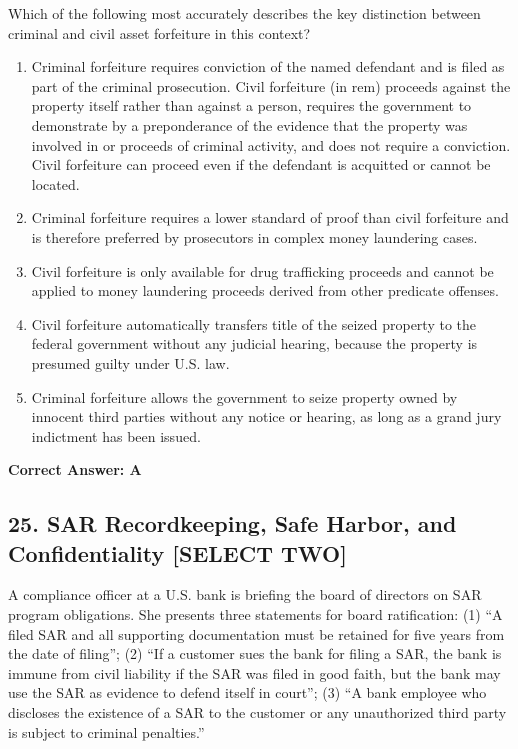 \documentclass[11pt,a4paper]{article}
\begin{document}
	Which of the following most accurately describes the key distinction between criminal and civil asset forfeiture in this context?
	
	\begin{enumerate}[label=\Alph*.]
		\item Criminal forfeiture requires conviction of the named defendant and is filed as part of the criminal prosecution. Civil forfeiture (in rem) proceeds against the property itself rather than against a person, requires the government to demonstrate by a preponderance of the evidence that the property was involved in or proceeds of criminal activity, and does not require a conviction. Civil forfeiture can proceed even if the defendant is acquitted or cannot be located.
		\item Criminal forfeiture requires a lower standard of proof than civil forfeiture and is therefore preferred by prosecutors in complex money laundering cases.
		\item Civil forfeiture is only available for drug trafficking proceeds and cannot be applied to money laundering proceeds derived from other predicate offenses.
		\item Civil forfeiture automatically transfers title of the seized property to the federal government without any judicial hearing, because the property is presumed guilty under U.S. law.
		\item Criminal forfeiture allows the government to seize property owned by innocent third parties without any notice or hearing, as long as a grand jury indictment has been issued.
	\end{enumerate}
	\textbf{Correct Answer: A}
	
	\subsection{25. SAR Recordkeeping, Safe Harbor, and Confidentiality \textnormal{[SELECT TWO]}}
	
	A compliance officer at a U.S. bank is briefing the board of directors on SAR program obligations. She presents three statements for board ratification: (1) ``A filed SAR and all supporting documentation must be retained for five years from the date of filing''; (2) ``If a customer sues the bank for filing a SAR, the bank is immune from civil liability if the SAR was filed in good faith, but the bank may use the SAR as evidence to defend itself in court''; (3) ``A bank employee who discloses the existence of a SAR to the customer or any unauthorized third party is subject to criminal penalties.''
	
\end{document}
